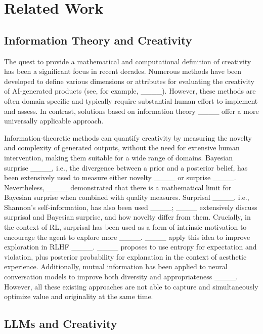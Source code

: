 \section{Related Work}
\label{related_work}

\subsection{Information Theory and Creativity}

The quest to provide a mathematical and computational definition of creativity has been a significant focus in recent decades. Numerous methods have been developed to define various dimensions or attributes for evaluating the creativity of AI-generated products (see, for example, ____). However, these methods are often domain-specific and typically require substantial human effort to implement and assess. In contrast, solutions based on information theory ____ offer a more universally applicable approach. 

Information-theoretic methods can quantify creativity by measuring the novelty and complexity of generated outputs,
without the need for extensive human intervention, making them suitable for a wide range of domains. 
Bayesian surprise ____, i.e., the divergence between a prior and a posterior belief, has been extensively used to measure either novelty ____ or surprise ____. Nevertheless, ____ demonstrated that there is a mathematical limit for Bayesian surprise when combined with quality measures. Surprisal ____, i.e., Shannon's self-information, has also been used ____; ____ extensively discuss surprisal and Bayesian surprise, and how novelty differ from them. Crucially, in the context of RL, surprisal has been used as a form of intrinsic motivation to encourage the agent to explore more ____. ____ apply this idea to improve exploration in RLHF ____.
____ proposes to use entropy for expectation and violation, plus posterior probability for explanation in the context of aesthetic experience. Additionally, mutual information has been applied to neural conversation models to improve both diversity and appropriateness ____. 
However, all these existing approaches are not able to capture and simultaneously optimize value and originality at the same time.

\subsection{LLMs and Creativity}


